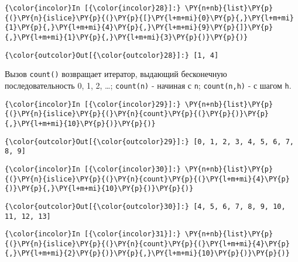     \begin{Verbatim}[commandchars=\\\{\}]
{\color{incolor}In [{\color{incolor}28}]:} \PY{n+nb}{list}\PY{p}{(}\PY{n}{islice}\PY{p}{(}\PY{p}{[}\PY{l+m+mi}{0}\PY{p}{,}\PY{l+m+mi}{1}\PY{p}{,}\PY{l+m+mi}{4}\PY{p}{,}\PY{l+m+mi}{9}\PY{p}{]}\PY{p}{,}\PY{l+m+mi}{1}\PY{p}{,}\PY{l+m+mi}{3}\PY{p}{)}\PY{p}{)}
\end{Verbatim}


\begin{Verbatim}[commandchars=\\\{\}]
{\color{outcolor}Out[{\color{outcolor}28}]:} [1, 4]
\end{Verbatim}
            
    Вызов \texttt{count()} возвращает итератор, выдающий бесконечную
последовательность 0, 1, 2, \dots; \texttt{count(n)} - начиная с
\texttt{n}; \texttt{count(n,h)} - с шагом \texttt{h}.

    \begin{Verbatim}[commandchars=\\\{\}]
{\color{incolor}In [{\color{incolor}29}]:} \PY{n+nb}{list}\PY{p}{(}\PY{n}{islice}\PY{p}{(}\PY{n}{count}\PY{p}{(}\PY{p}{)}\PY{p}{,}\PY{l+m+mi}{10}\PY{p}{)}\PY{p}{)}
\end{Verbatim}


\begin{Verbatim}[commandchars=\\\{\}]
{\color{outcolor}Out[{\color{outcolor}29}]:} [0, 1, 2, 3, 4, 5, 6, 7, 8, 9]
\end{Verbatim}
            
    \begin{Verbatim}[commandchars=\\\{\}]
{\color{incolor}In [{\color{incolor}30}]:} \PY{n+nb}{list}\PY{p}{(}\PY{n}{islice}\PY{p}{(}\PY{n}{count}\PY{p}{(}\PY{l+m+mi}{4}\PY{p}{)}\PY{p}{,}\PY{l+m+mi}{10}\PY{p}{)}\PY{p}{)}
\end{Verbatim}


\begin{Verbatim}[commandchars=\\\{\}]
{\color{outcolor}Out[{\color{outcolor}30}]:} [4, 5, 6, 7, 8, 9, 10, 11, 12, 13]
\end{Verbatim}
            
    \begin{Verbatim}[commandchars=\\\{\}]
{\color{incolor}In [{\color{incolor}31}]:} \PY{n+nb}{list}\PY{p}{(}\PY{n}{islice}\PY{p}{(}\PY{n}{count}\PY{p}{(}\PY{l+m+mi}{4}\PY{p}{,}\PY{l+m+mi}{2}\PY{p}{)}\PY{p}{,}\PY{l+m+mi}{10}\PY{p}{)}\PY{p}{)}
\end{Verbatim}


